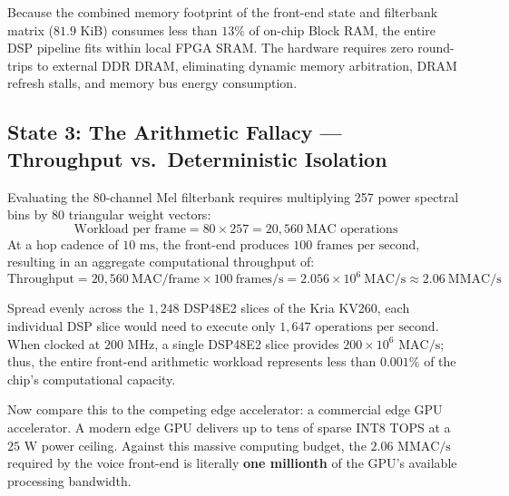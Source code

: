 \documentclass[11pt,a4paper]{article}
\begin{document}
\begin{physicalinsight}
Because the combined memory footprint of the front-end state and filterbank matrix ($81.9\text{ KiB}$) consumes less than $13\%$ of on-chip Block RAM, the entire DSP pipeline fits within local FPGA SRAM. The hardware requires zero round-trips to external DDR DRAM, eliminating dynamic memory arbitration, DRAM refresh stalls, and memory bus energy consumption.
\end{physicalinsight}

\vspace{-2.5mm}
\subsection*{State 3: The Arithmetic Fallacy --- Throughput vs.\ Deterministic Isolation}
\vspace{-2mm}

Evaluating the 80-channel Mel filterbank requires multiplying 257 power spectral bins by 80 triangular weight vectors:
$$\text{Workload per frame} = 80 \times 257 = 20{,}560\ \text{MAC operations}$$
At a hop cadence of $10\text{ ms}$, the front-end produces $100\text{ frames per second}$, resulting in an aggregate computational throughput of:
$$\text{Throughput} = 20{,}560\ \text{MAC/frame} \times 100\ \text{frames/s} = 2.056 \times 10^6\ \text{MAC/s} \approx 2.06\ \text{MMAC/s}$$

Spread evenly across the $1{,}248$ DSP48E2 slices of the Kria KV260, each individual DSP slice would need to execute only \textbf{$1{,}647\text{ operations per second}$}. When clocked at $200\text{ MHz}$, a single DSP48E2 slice provides $200 \times 10^6\text{ MAC/s}$; thus, the entire front-end arithmetic workload represents less than $0.001\%$ of the chip's computational capacity.

Now compare this to the competing edge accelerator: a commercial edge GPU accelerator. A modern edge GPU delivers up to tens of sparse INT8 TOPS at a $25\text{ W}$ power ceiling. Against this massive computing budget, the $2.06\text{ MMAC/s}$ required by the voice front-end is literally \textbf{one millionth} of the GPU's available processing bandwidth.
\end{document}
